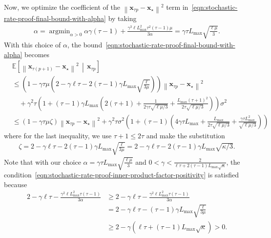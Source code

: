 \documentclass{article}
\newcommand{\vx}{{\mathbf{x}}}
\DeclareMathOperator*{\argmin}{argmin}
\newcommand{\sqnorm}[1]{\left\| #1 \right\|^2}
\theoremstyle{plain}
\theoremstyle{remark}
\begin{document}
Now, we optimize the coefficient of the $\sqnorm{\vx_{\tau p} - \vx_\star}$ term in~\eqref{eqn:stochastic-rate-proof-final-bound-with-alpha} by taking
\begin{align*}
    \alpha = \argmin_{\alpha>0} \alpha \gamma(\tau-1) + \frac{\gamma^3 \ell L_{\mathrm{max}}^2 \tau^2 (\tau-1) \mu}{3\alpha} = \gamma \tau L_{\mathrm{max}} \sqrt{\frac{\ell\mu}{3}} .
\end{align*}
With this choice of $\alpha$, the bound~\eqref{eqn:stochastic-rate-proof-final-bound-with-alpha} becomes
\begin{align}
    & \mathbb{E} \left[\sqnorm{\vx_{\tau (p+1)} - \vx_\star} \,\middle|\, \vx_{\tau p} \right] \nonumber \\
    & \le \left( 1 - \gamma\tau\mu \left( 2-\gamma\ell\tau - 2 (\tau - 1) \gamma L_{\mathrm{max}} \sqrt{\frac{\ell}{3\mu}} \right)  \right) \sqnorm{\vx_{\tau p} - \vx_\star} \nonumber \\
    & \quad + \gamma^2 \tau \left( 1 + (\tau-1) \gamma L_\mathrm{max} \left( 2(\tau+1) + \frac{1}{2\gamma\tau\sqrt{\ell\mu/3}} + \frac{L_\mathrm{max} (\tau+1)^2}{2\tau\sqrt{\ell\mu/3}} \right) \right) \sigma^2 \nonumber \\
    & \le \left( 1 - \gamma\tau\mu \zeta \right) \sqnorm{\vx_{\tau p} - \vx_\star} + \gamma^2 \tau \sigma^2 \left( 1 + (\tau - 1) \left( 4\gamma\tau L_{\mathrm{max}} + \frac{L_{\mathrm{max}}}{2\tau\sqrt{\ell\mu/3}} + \frac{\gamma\tau L_{\mathrm{max}}^2}{\sqrt{\ell\mu/3}} \right) \right) \label{eqn:stochastic-rate-proof-final-recursion}
\end{align}
where for the last inequality, we use $\tau + 1 \le 2\tau$ and make the substitution
\begin{align*}
    \zeta = 2 - \gamma\ell\tau - 2 (\tau - 1) \gamma L_{\mathrm{max}} \sqrt{\frac{\ell}{3\mu}} = 2 - \gamma\ell\tau - 2 (\tau - 1) \gamma L_{\mathrm{max}} \sqrt{\kappa/3} .
\end{align*}
Note that with our choice $\alpha = \gamma\tau L_{\mathrm{max}} \sqrt{\frac{\ell\mu}{3}}$ and $0 < \gamma < \frac{2}{\ell\tau + 2(\tau - 1) L_{\mathrm{max}} \sqrt{\kappa}}$, the condition~\eqref{eqn:stochastic-rate-proof-inner-product-factor-positivity} is satisfied because
\begin{align*}
    2 - \gamma\ell \tau - \frac{\gamma^2 \ell L_{\mathrm{max}}^2 \tau(\tau-1)}{3\alpha} & \ge 2 - \gamma\ell\tau - \frac{\gamma^2 \ell L_{\mathrm{max}}^2 \tau(\tau-1)}{3\alpha} \\
    & = 2 - \gamma\ell\tau - (\tau-1) \gamma L_{\mathrm{max}} \sqrt{\frac{\ell}{3\mu}} \\
    & \ge 2 - \gamma \left( \ell\tau + (\tau-1) L_{\mathrm{max}} \sqrt{\kappa} \right) > 0 .
\end{align*}
\end{document}

